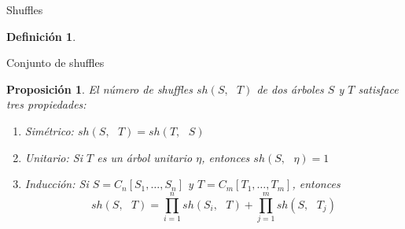 \documentclass[12pt,aspectratio=169]{beamer}
\numberwithin{equation}{section}
\newtheorem{prop}[teo]{Proposici\'on}
\theoremstyle{definition}
\newtheorem{defi}[teo]{Definici\'on}
\begin{document}
{\begin{frame}{Shuffles}
\begin{defi}
    \end{defi}
\end{frame}
\begin{frame}{Conjunto de shuffles}
    \begin{prop}
        El n\'umero de shuffles $sh(S,\text{ }T)$ de dos \'arboles $S$ y $T$ satisface tres propiedades:
        \begin{enumerate}
            \item[{\rm (i)}] Sim\'etrico: $sh(S, \text{ }T) = sh(T, \text{ }S)$
            \item[{\rm (ii)}] Unitario: Si $T$ es un \'arbol unitario $\eta$, entonces $sh(S, \text{ }\eta)=1$
            \item[{\rm (iii)}] Inducci\'on: Si $S=C_n[S_1,\dots,S_n]$ y $T=C_m[T_1,\dots,T_m]$, entonces
                  $$
                      sh(S, \text{ }T)  = \prod_{i=1}^n sh(S_i, \text{ }T) + \prod_{j=1}^m sh(S, \text{ }T_j)
                  $$
        \end{enumerate}
    \end{prop}
\end{frame}

}
\end{document}
